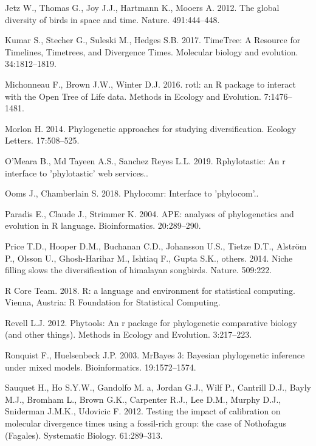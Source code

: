 \documentclass[]{article}
\begin{document}
\leavevmode\hypertarget{ref-Jetz2012}{}%
Jetz W., Thomas G., Joy J.J., Hartmann K., Mooers A. 2012. The global diversity of birds in space and time. Nature. 491:444--448.

\leavevmode\hypertarget{ref-Kumar2017}{}%
Kumar S., Stecher G., Suleski M., Hedges S.B. 2017. TimeTree: A Resource for Timelines, Timetrees, and Divergence Times. Molecular biology and evolution. 34:1812--1819.

\leavevmode\hypertarget{ref-Michonneau2016}{}%
Michonneau F., Brown J.W., Winter D.J. 2016. rotl: an R package to interact with the Open Tree of Life data. Methods in Ecology and Evolution. 7:1476--1481.

\leavevmode\hypertarget{ref-Morlon2014}{}%
Morlon H. 2014. Phylogenetic approaches for studying diversification. Ecology Letters. 17:508--525.

\leavevmode\hypertarget{ref-Omeara2019}{}%
O'Meara B., Md Tayeen A.S., Sanchez Reyes L.L. 2019. Rphylotastic: An r interface to 'phylotastic' web services..

\leavevmode\hypertarget{ref-Ooms2018}{}%
Ooms J., Chamberlain S. 2018. Phylocomr: Interface to 'phylocom'..

\leavevmode\hypertarget{ref-Paradis2004}{}%
Paradis E., Claude J., Strimmer K. 2004. APE: analyses of phylogenetics and evolution in R language. Bioinformatics. 20:289--290.

\leavevmode\hypertarget{ref-price2014niche}{}%
Price T.D., Hooper D.M., Buchanan C.D., Johansson U.S., Tietze D.T., Alström P., Olsson U., Ghosh-Harihar M., Ishtiaq F., Gupta S.K., others. 2014. Niche filling slows the diversification of himalayan songbirds. Nature. 509:222.

\leavevmode\hypertarget{ref-RCoreTeam2018}{}%
R Core Team. 2018. R: a language and environment for statistical computing. Vienna, Austria: R Foundation for Statistical Computing.

\leavevmode\hypertarget{ref-Revell2012}{}%
Revell L.J. 2012. Phytools: An r package for phylogenetic comparative biology (and other things). Methods in Ecology and Evolution. 3:217--223.

\leavevmode\hypertarget{ref-Ronquist2003}{}%
Ronquist F., Huelsenbeck J.P. 2003. MrBayes 3: Bayesian phylogenetic inference under mixed models. Bioinformatics. 19:1572--1574.

\leavevmode\hypertarget{ref-Sauquet2012c}{}%
Sauquet H., Ho S.Y.W., Gandolfo M. a, Jordan G.J., Wilf P., Cantrill D.J., Bayly M.J., Bromham L., Brown G.K., Carpenter R.J., Lee D.M., Murphy D.J., Sniderman J.M.K., Udovicic F. 2012. Testing the impact of calibration on molecular divergence times using a fossil-rich group: the case of Nothofagus (Fagales). Systematic Biology. 61:289--313.
\end{document}
